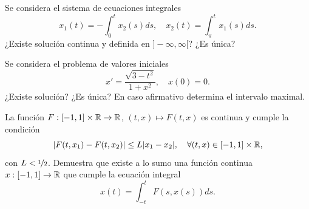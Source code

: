 \documentclass[12pt]{article}
\begin{document}
    \begin{ejercicio}
        Se considera el sistema de ecuaciones integrales
        \[
        x_1(t) = -\int_{0}^{t} x_2(s)ds, \quad x_2(t) = \int_{\pi}^{t} x_1(s)ds.
        \]
        ¿Existe solución continua y definida en $]-\infty, \infty[$? ¿Es única?
    \end{ejercicio}

    \begin{ejercicio}
        Se considera el problema de valores iniciales
        \[
        x' = \frac{\sqrt{3 - t^2}}{1 + x^2}, \quad x(0) = 0.
        \]
        ¿Existe solución? ¿Es única? En caso afirmativo determina el intervalo maximal.
    \end{ejercicio}

    \begin{ejercicio}
        La función $F : [-1, 1] \times \mathbb{R} \to \mathbb{R}$, $(t, x) \mapsto F(t, x)$ es continua y cumple la condición
        \[
        |F(t, x_1) - F(t, x_2)| \leq L|x_1 - x_2|, \quad \forall(t, x) \in [-1, 1] \times \mathbb{R},
        \]
        con $L < \nicefrac{1}{2}$. Demuestra que existe a lo sumo una función continua $x : [-1, 1] \to \mathbb{R}$ que cumple la ecuación integral
        \[
        x(t) = \int_{-t}^{t} F(s, x(s))ds.
        \]
    \end{ejercicio}

    \newpage
    \setcounter{ejercicio}{0} %
\end{document}
